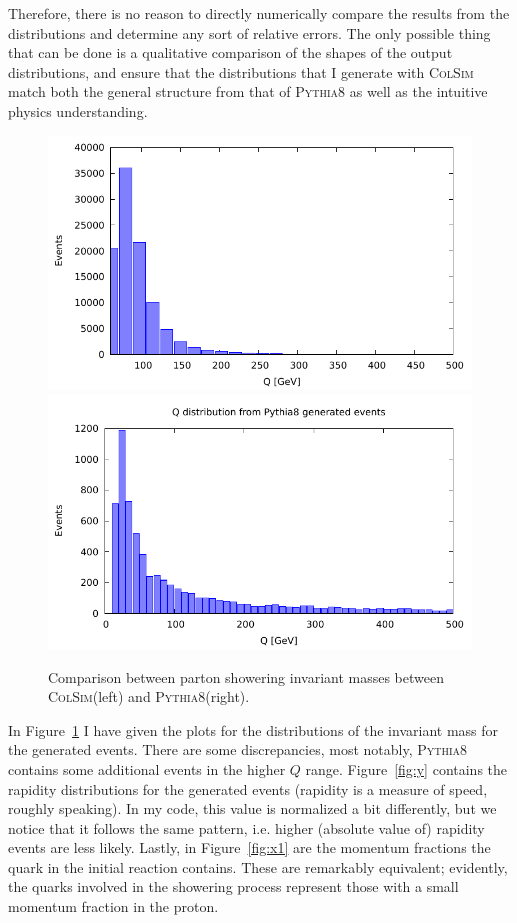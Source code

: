 Therefore, there is no reason to directly numerically compare the results from the distributions and determine any sort of relative errors. The only possible thing that can be done is a qualitative comparison of the shapes of the output distributions, and ensure that the distributions that I generate with \textsc{ColSim} match both the general structure from that of \textsc{Pythia8} as well as the intuitive physics understanding.


\begin{figure}[ht]
  \centering
  \includegraphics[width=0.49\linewidth]{./res/gfx/Q-colsim.pdf}
  \includegraphics[width=0.49\linewidth]{./res/gfx/Q-pythia.pdf}
  \caption{Comparison between parton showering invariant masses between \textsc{ColSim}(left) and \textsc{Pythia8}(right).}
  \label{fig:Q}
\end{figure}

In Figure~\ref{fig:Q} I have given the plots for the distributions of the invariant mass for the generated events. There are some discrepancies, most notably, \textsc{Pythia8} contains some additional events in the higher $Q$ range. Figure~\ref{fig:y} contains the rapidity distributions for the generated events (rapidity is a measure of speed, roughly speaking). In my code, this value is normalized a bit differently, but we notice that it follows the same pattern, i.e. higher (absolute value of) rapidity events are less likely. Lastly, in Figure~\ref{fig:x1} are the momentum fractions the quark in the initial reaction contains. These are remarkably equivalent; evidently, the quarks involved in the showering process represent those with a small momentum fraction in the proton.


